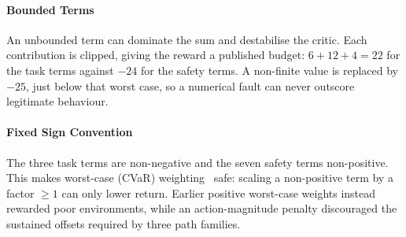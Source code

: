\paragraph{Bounded Terms}
An unbounded term can dominate the sum and destabilise the critic. Each
contribution is clipped, giving the reward a published budget: $6+12+4 = 22$ for
the task terms against $-24$ for the safety terms. A non-finite value is
replaced by $-25$, just below that worst case, so a numerical fault can never
outscore legitimate behaviour.

\paragraph{Fixed Sign Convention}
The three task terms are non-negative and the seven safety terms non-positive.
This makes worst-case (CVaR) weighting~\cite{rockafellar2000cvar} safe: scaling
a non-positive term by a factor $\ge 1$ can only lower return. Earlier positive
worst-case weights instead rewarded poor environments, while an action-magnitude
penalty discouraged the sustained offsets required by three path families.


